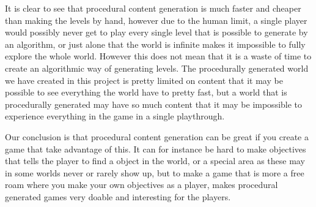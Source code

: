 It is clear to see that procedural content generation is much faster and cheaper than making the levels by hand, however due to the human limit, a single player would possibly never get to play every single level that is possible to generate by an algorithm, or just alone that the world is infinite makes it impossible to fully explore the whole world. However this does not mean that it is a waste of time to create an algorithmic way of generating levels. The procedurally generated world we have created in this project is pretty limited on content that it may be possible to see everything the world have to pretty fast, but a world that is procedurally generated may have so much content that it may be impossible to experience everything in the game in a single playthrough.

Our conclusion is that procedural content generation can be great if you create a game that take advantage of this. It can for instance be hard to make objectives that tells the player to find a object in the world, or a special area as these may in some worlds never or rarely show up, but to make a game that is more a free roam where you make your own objectives as a player, makes procedural generated games very doable and interesting for the players.